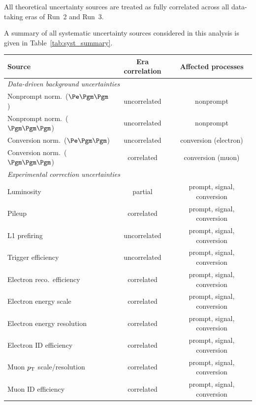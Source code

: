 All theoretical uncertainty sources are treated as fully correlated across all data-taking eras of Run~2 and Run~3.

A summary of all systematic uncertainty sources considered in this analysis is given in Table~\ref{tab:syst_summary}.

\begin{table}[htbp]
  \centering
  \begin{tabular}{lcc}
    \hline
    Source & Era correlation & Affected processes \\
    \hline
    \multicolumn{3}{l}{\textit{Data-driven background uncertainties}} \\
    Nonprompt norm.\ ($\Pe\Pgm\Pgm$)     & uncorrelated     & nonprompt \\
    Nonprompt norm.\ ($\Pgm\Pgm\Pgm$)    & uncorrelated     & nonprompt \\
    Conversion norm.\ ($\Pe\Pgm\Pgm$)     & uncorrelated     & conversion (electron) \\
    Conversion norm.\ ($\Pgm\Pgm\Pgm$)    & correlated       & conversion (muon) \\
    \hline
    \multicolumn{3}{l}{\textit{Experimental correction uncertainties}} \\
    Luminosity                             & partial          & prompt, signal, conversion \\
    Pileup                                 & correlated       & prompt, signal, conversion \\
    L1 prefiring                           & uncorrelated     & prompt, signal, conversion \\
    Trigger efficiency                     & uncorrelated     & prompt, signal, conversion \\
    Electron reco.\ efficiency             & correlated       & prompt, signal, conversion \\
    Electron energy scale                  & correlated       & prompt, signal, conversion \\
    Electron energy resolution             & correlated       & prompt, signal, conversion \\
    Electron ID efficiency                 & correlated       & prompt, signal, conversion \\
    Muon $p_{\mathrm{T}}$ scale/resolution            & correlated       & prompt, signal, conversion \\
    Muon ID efficiency                     & correlated       & prompt, signal, conversion \\

\end{tabular}
\end{table}

